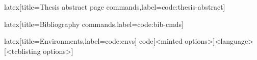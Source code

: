 %
\begin{code}{latex}[title={Thesis abstract page commands},label=code:thesis-abstract]
\makethesisabstract
\end{code}
%
\begin{code}{latex}[title={Bibliography commands},label=code:bib-cmds]
\makebibliography[<options>]
\end{code}
%
\begin{code}{latex}[title={Environments},label=code:envs]
{code}[<minted options>]{<language>}[<tcblisting options>]
\end{code}

\begin{comment}

\clearpage
\subsection{subsection 1}

\section{Test appendix 2}

\section{Test appendix 3}
\clearpage
\subsection{subsection 1}
\clearpage
\subsection{subsection 2}
\clearpage

\end{comment}
